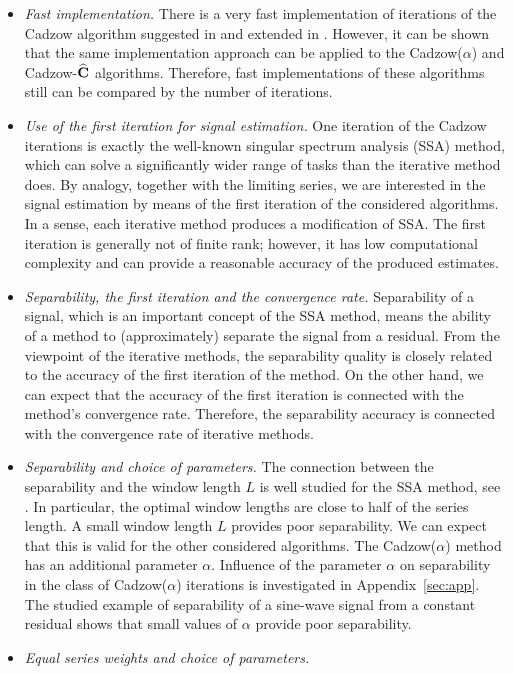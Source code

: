 \documentclass[sii]{ipart}
\begin{document}
\begin{itemize}
\item \textit{Fast implementation.}
There is a very fast implementation of iterations of the Cadzow algorithm suggested in \cite{Korobeynikov2010} and extended in \cite{Golyandina.etal2015}. However, it can be shown that the same implementation approach can be applied to the Cadzow($\alpha$) and Cadzow-$\widehat{\mathbf{C}}$ algorithms. Therefore, fast implementations of these algorithms still can be compared by the number of iterations.
		\item \textit{Use of the first iteration for signal estimation.}
		One iteration of the Cadzow iterations is exactly the well-known singular spectrum analysis (SSA) method, which can solve a significantly wider range of tasks than the iterative method does. By analogy, together with the limiting series, we are interested in the signal estimation by means of the first iteration of the considered algorithms. In a sense, each iterative method produces a modification of SSA. The first iteration is generally not of finite rank; however, it has low computational complexity and can provide a reasonable accuracy of the produced estimates.
		\item \textit{Separability, the first iteration and the convergence rate.}
		Separability of a signal, which is an important concept of the SSA method, means the ability of a method to (approximately) separate the signal from a residual. From the viewpoint of the iterative methods,  the separability quality is closely related to the accuracy of the first iteration of the method. On the other hand, we can expect that the accuracy of the first iteration is connected with the method's convergence rate. Therefore, the separability accuracy is connected with the convergence rate of iterative methods.
		\item \textit{Separability and choice of parameters.}
		The connection between the separability and the window length $L$ is well studied for the SSA method, see \cite{Golyandina2010}. In particular, the optimal window lengths are close to half of the series length. A small window length $L$ provides poor separability. We can expect that this is valid for the other considered algorithms.
The Cadzow($\alpha$) method has an additional parameter $\alpha$.
Influence of the parameter $\alpha$ on separability in the class of Cadzow($\alpha$) iterations is investigated in Appendix~\ref{sec:app}.
 The studied example of separability of a sine-wave signal from a constant residual shows that small values of $\alpha$ provide poor separability.
        \item \textit{Equal series weights and choice of parameters.}

\end{itemize}
\end{document}
